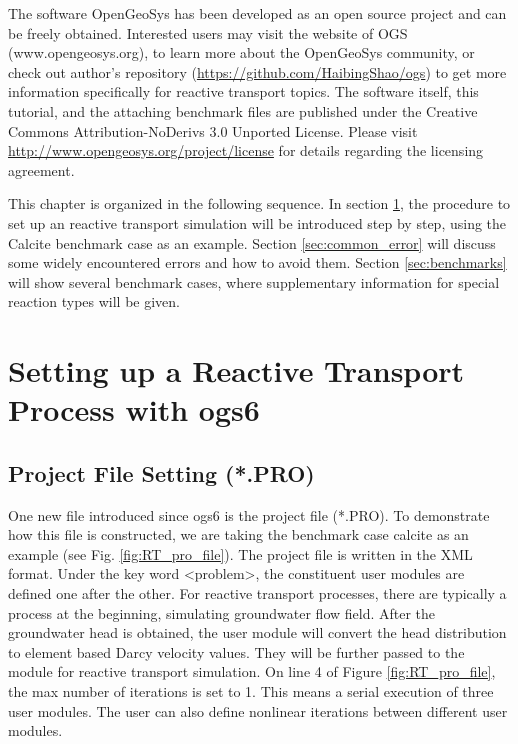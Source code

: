 The software OpenGeoSys has been developed as an open source project and can be freely obtained. Interested users may visit the website of OGS (www.opengeosys.org), to learn more about the OpenGeoSys community, or check out author's repository (\url{https://github.com/HaibingShao/ogs}) to get more information specifically for reactive transport topics. The software itself, this tutorial, and the attaching benchmark files are published under the Creative Commons Attribution-NoDerivs 3.0 Unported License. Please visit \url{http://www.opengeosys.org/project/license} for details regarding the licensing agreement. 

This chapter is organized in the following sequence. In section \ref{sec:tutorial}, the procedure to set up an reactive transport simulation will be introduced step by step, using the Calcite benchmark case as an example. Section \ref{sec:common_error} will discuss some widely encountered errors and how to avoid them. Section \ref{sec:benchmarks} will show several benchmark cases, where supplementary information for special reaction types will be given. 

\section{Setting up a Reactive Transport Process with ogs6}
\label{sec:tutorial}
\subsection{Project File Setting (*.PRO)}
One new file introduced since ogs6 is the project file (*.PRO). To demonstrate how this file is constructed, we are taking the benchmark case calcite as an example (see Fig. \ref{fig:RT_pro_file}). The project file is written in the XML format. Under the key word <problem>, the constituent user modules are defined one after the other. For reactive transport processes, there are typically a  process at the beginning, simulating groundwater flow field. After the groundwater head is obtained, the user module  will convert the head distribution to element based Darcy velocity values. They will be further passed to the  module for reactive transport simulation. On line 4 of Figure \ref{fig:RT_pro_file}, the max number of iterations is set to 1. This means a serial execution of three user modules. The user can also define nonlinear iterations between different user modules. 

